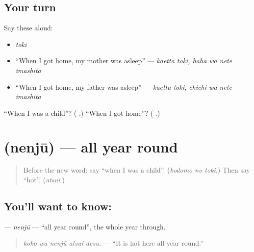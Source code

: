 \subsection*{Your turn}
Say these aloud:

\begin{itemize}
\raggedright
  \item \emph{toki}
  \item \textquotedblleft{}When I got home, my mother was asleep\textquotedblright{} — \emph{kaetta toki, haha wa nete imashita}
  \item \textquotedblleft{}When I got home, my father was asleep\textquotedblright{} — \emph{kaetta toki, chichi wa nete imashita}
\end{itemize}

\begin{tcolorbox}[breakable,colback=teal!4,colframe=teal!35!black,title={Before you move on}]
\textquotedblleft{}When I was a child\textquotedblright{}? (\textbf{ }.) \textquotedblleft{}When I got home\textquotedblright{}? (\textbf{ }.)
\end{tcolorbox}
\section[\texorpdfstring{\ja{年}\ja{じゅう} (nenjū)}{年じゅう (nenjū)}]{ (nenjū) — all year round}

\label{lesson:JA-C253-nenjuu}



\begin{quote}
Before the new word: say \textquotedblleft{}when I was a child\textquotedblright{}. (\emph{kodomo no toki}.) Then say \textquotedblleft{}hot\textquotedblright{}. (\emph{atsui}.)
\end{quote}

\subsection*{You'll want to know: }
\textbf{} — \emph{nenjū} — \textquotedblleft{}all year round\textquotedblright{}, the whole year through.

\begin{quote}
\textbf{  }
\end{quote}

\begin{quote}
\emph{koko wa nenjū atsui desu.} — \textquotedblleft{}It is hot here all year round.\textquotedblright{}
\end{quote}

